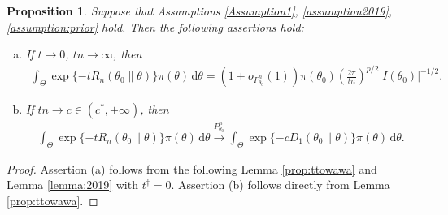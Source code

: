 \documentclass[11pt]{article}
\theoremstyle{plain}
\newtheorem{proposition}{\quad\quad Proposition}
\theoremstyle{definition}
\theoremstyle{remark}
\begin{document}
\begin{appendices}
\begin{proposition}
    Suppose that Assumptions \ref{Assumption1}, \ref{assumption2019}, \ref{assumption:prior} hold.
Then the following assertions hold:
\begin{enumerate}[(a)]
        \item 
            If $t \to 0$, $tn \to \infty$, then
\begin{align*}
     \int_{\Theta} \exp \{-t R_n (\theta_0\| \theta)\} \pi (\theta) \, \mathrm d \theta  
     = (1+o_{P_{\theta_0}^n}(1))\pi(\theta_0) \left( \frac{2\pi}{tn} \right)^{p/2} |I(\theta_0)|^{-1/2}.
\end{align*}
        \item
            If $tn \to c \in (c^*,+\infty)$, then
\begin{align*}
     \int_{\Theta} \exp \{-t R_n (\theta_0\| \theta)\} \pi (\theta) \, \mathrm d \theta  
     \xrightarrow{P_{\theta_0}^n}
    \int_\Theta \exp \{-c D_1 \left( \theta_0 \| \theta \right)\} \pi(\theta) \, \mathrm d \theta.
\end{align*}
    \end{enumerate}
    \label{prop:tto0}
\end{proposition}
\begin{proof}
    Assertion (a) follows from the following Lemma \ref{prop:ttowawa} and Lemma \ref{lemma:2019} with $t^\dagger = 0$.
    Assertion (b) follows directly from Lemma \ref{prop:ttowawa}.
\end{proof}




\end{appendices}
\end{document}
